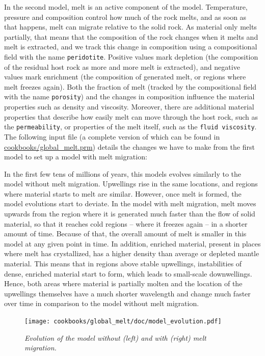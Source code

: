 \documentclass{article}
\begin{document}
In the second model, melt is an active component of the model. Temperature, pressure and composition control how much of the rock melts, and as soon as that happens, melt can migrate relative to the solid rock. As material only melts partially, that means that the composition of the rock changes when it melts and melt is extracted, and we track this change in composition using a compositional field with the name \texttt{peridotite}. Positive values mark depletion (the composition of the residual host rock as more and more melt is extracted), and negative values mark enrichment (the composition of generated melt, or regions where melt freezes again). Both the fraction of melt (tracked by the compositional field with the name \texttt{porosity}) and the changes in composition influence the material properties such as density and viscosity. Moreover, there are additional material properties that describe how easily melt can move through the host rock, such as the \texttt{permeability}, or properties of the melt itself, such as the \texttt{fluid viscosity}.
The following input file (a complete version of which can be found in \url{cookbooks/global_melt.prm}) details the changes we have to make from the first model to set up a model with melt migration:



In the first few tens of millions of years, this models evolves similarly to the model without melt migration. Upwellings rise in the same locations, and regions where material starts to melt are similar. However, once melt is formed, the model evolutions start to deviate. In the model with melt migration, melt moves upwards from the region where it is generated much faster than the flow of solid material, so that it reaches cold regions -- where it freezes again -- in a shorter amount of time. Because of that, the overall amount of melt is smaller in this model at any given point in time. In addition, enriched material, present in places where melt has crystallized, has a higher density than average or depleted mantle material. This means that in regions above stable upwellings, instabilities of dense, enriched material start to form, which leads to small-scale downwellings. Hence, both areas where material is partially molten and the location of the upwellings themselves have a much shorter wavelength and change much faster over time in comparison to the model without melt migration.

\begin{figure}
    \centering
    \texttt{[image: cookbooks/global\_melt/doc/model\_evolution.pdf]}
    \caption{\it Evolution of the model without (left) and with (right) melt migration.}
    \label{fig:global-melt}
\end{figure}
\end{document}
